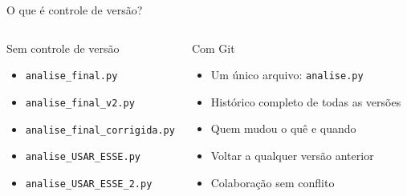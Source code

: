 \begin{frame}[fragile]{O que é controle de versão?}
\begin{columns}
\begin{alertblock}{Sem controle de versão}
\begin{itemize}
    \item \texttt{analise\_final.py}
    \item \texttt{analise\_final\_v2.py}
    \item \texttt{analise\_final\_corrigida.py}
    \item \texttt{analise\_USAR\_ESSE.py}
    \item \texttt{analise\_USAR\_ESSE\_2.py}
\end{itemize}
\end{alertblock}

\begin{exampleblock}{Com Git}
\begin{itemize}
    \item Um único arquivo: \texttt{analise.py}
    \item Histórico completo de todas as versões
    \item Quem mudou o quê e quando
    \item Voltar a qualquer versão anterior
    \item Colaboração sem conflito
\end{itemize}
\end{exampleblock}
\end{columns}

\vspace{0.3cm}
\end{frame}

